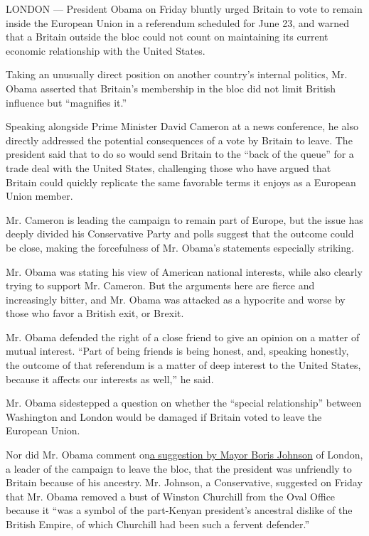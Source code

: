 LONDON --- President Obama on Friday bluntly urged Britain to vote to
remain inside the European Union in a referendum scheduled for June 23,
and warned that a Britain outside the bloc could not count on
maintaining its current economic relationship with the United States.

Taking an unusually direct position on another country's internal
politics, Mr. Obama asserted that Britain's membership in the bloc did
not limit British influence but ``magnifies it.''

Speaking alongside Prime Minister David Cameron at a news conference, he
also directly addressed the potential consequences of a vote by Britain
to leave. The president said that to do so would send Britain to the
``back of the queue'' for a trade deal with the United States,
challenging those who have argued that Britain could quickly replicate
the same favorable terms it enjoys as a European Union member.

Mr. Cameron is leading the campaign to remain part of Europe, but the
issue has deeply divided his Conservative Party and polls suggest that
the outcome could be close, making the forcefulness of Mr. Obama's
statements especially striking.

Mr. Obama was stating his view of American national interests, while
also clearly trying to support Mr. Cameron. But the arguments here are
fierce and increasingly bitter, and Mr. Obama was attacked as a
hypocrite and worse by those who favor a British exit, or Brexit.

Mr. Obama defended the right of a close friend to give an opinion on a
matter of mutual interest. ``Part of being friends is being honest, and,
speaking honestly, the outcome of that referendum is a matter of deep
interest to the United States, because it affects our interests as
well,'' he said.

Mr. Obama sidestepped a question on whether the ``special relationship''
between Washington and London would be damaged if Britain voted to leave
the European Union.

Nor did Mr. Obama comment
on\href{http://www.nytimes.com/2016/04/23/world/europe/boris-johnson-the-sun-brexit.html}{a
suggestion by Mayor Boris Johnson} of London, a leader of the campaign
to leave the bloc, that the president was unfriendly to Britain because
of his ancestry. Mr. Johnson, a Conservative, suggested on Friday that
Mr. Obama removed a bust of Winston Churchill from the Oval Office
because it ``was a symbol of the part-Kenyan president's ancestral
dislike of the British Empire, of which Churchill had been such a
fervent defender.''

